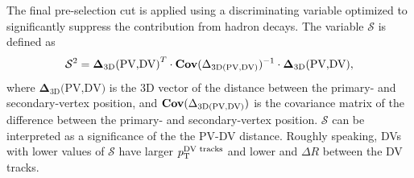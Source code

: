 The final pre-selection cut is applied using a discriminating variable optimized to significantly suppress the contribution from hadron decays. The variable $\mathcal{S}$ is defined as
\begin{equation}
    \mathcal{S}^{2} = {\boldsymbol{\Delta}_{\text{3D}}\text{(PV,DV)}}^T \cdot  {\text{\textbf{Cov}}(\Delta_{\text{3D}(\text{PV,DV})})^{-1}} \cdot {\boldsymbol{\Delta}_{\text{3D}}\text{(PV,DV)}},
\end{equation}
where $\boldsymbol{\Delta}_{\text{3D}}\text{(PV,DV)}$ is the 3D vector of the distance between the primary- and secondary-vertex position, and $\text{\textbf{Cov}}(\Delta_{\text{3D}(\text{PV,DV})})$ is the covariance matrix of the difference between the primary- and secondary-vertex position. $\mathcal{S}$ can be interpreted as a significance of the the PV-DV distance. 
Roughly speaking, DVs with lower values of $\mathcal{S}$ have larger $p_\mathrm{T}^\text{DV tracks}$ and lower \rdv and $\Delta R$ between the DV tracks.
 
